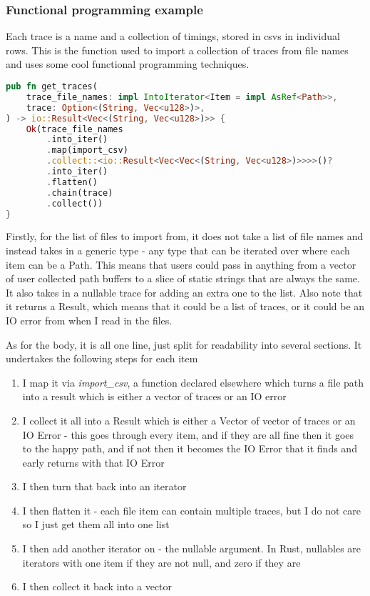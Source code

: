 \documentclass{article}
\begin{document}
\begin{multicols*}{2}
\subsubsection{Functional programming example}
Each trace is a name and a collection of timings, stored in csvs in individual rows. This is the function used to import a collection of traces from file names and uses some cool functional programming techniques.
\begin{lstlisting}[language=Rust]
pub fn get_traces(
	trace_file_names: impl IntoIterator<Item = impl AsRef<Path>>,
	trace: Option<(String, Vec<u128>)>,
) -> io::Result<Vec<(String, Vec<u128>)>> {
	Ok(trace_file_names
		.into_iter()
		.map(import_csv)
		.collect::<io::Result<Vec<Vec<(String, Vec<u128>)>>>>()?
		.into_iter()
		.flatten()
		.chain(trace)
		.collect())
}
\end{lstlisting}

Firstly, for the list of files to import from, it does not take a list of file names and instead takes in a generic type - any type that can be iterated over where each item can be a Path. This means that users could pass in anything from a vector of user collected path buffers to a slice of static strings that are always the same. It also takes in a nullable trace for adding an extra one to the list. Also note that it returns a Result, which means that it could be a list of traces, or it could be an IO error from when I read in the files.

As for the body, it is all one line, just split for readability into several sections. It undertakes the following steps for each item
\begin{enumerate}
	\item I map it via \textit{import\_csv}, a function declared elsewhere which turns a file path into a result which is either a vector of traces or an IO error
	\item I collect it all into a Result which is either a Vector of vector of traces or an IO Error - this goes through every item, and if they are all fine then it goes to the happy path, and if not then it becomes the IO Error that it finds and early returns with that IO Error
	\item I then turn that back into an iterator
	\item I then flatten it - each file item can contain multiple traces, but I do not care so I just get them all into one list
	\item I then add another iterator on - the nullable argument. In Rust, nullables are iterators with one item if they are not null, and zero if they are
	\item I then collect it back into a vector
\end{enumerate}


\end{multicols*}
\end{document}
